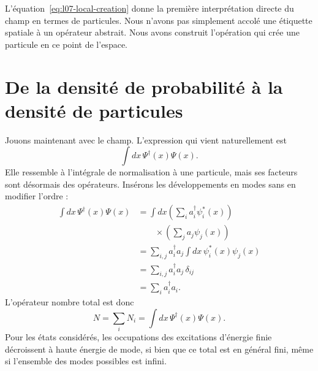 L’équation~\eqref{eq:l07-local-creation} donne la première interprétation directe du champ en termes de particules. Nous n’avons pas simplement accolé une étiquette spatiale à un opérateur abstrait. Nous avons construit l’opération qui crée une particule en ce point de l’espace.

\begin{classroomqa}
\end{classroomqa}

\begin{classroomqa}
\end{classroomqa}

\section{De la densité de probabilité à la densité de particules}

Jouons maintenant avec le champ. L’expression qui vient naturellement est
\begin{equation}
\int dx\,\Psi^\dagger(x)\Psi(x).
\end{equation}
Elle ressemble à l’intégrale de normalisation à une particule, mais ses facteurs sont désormais des opérateurs. Insérons les développements en modes sans en modifier l’ordre :
\begin{align}
\int dx\,\Psi^\dagger(x)\Psi(x)
&=\int dx
\left(\sum_i a_i^\dagger\psi_i^*(x)\right)\\
&\qquad\times\left(\sum_j a_j\psi_j(x)\right) \\
&=\sum_{i,j}a_i^\dagger a_j
\int dx\,\psi_i^*(x)\psi_j(x) \\
&=\sum_{i,j}a_i^\dagger a_j\,\delta_{ij} \\
&=\sum_i a_i^\dagger a_i.
\label{eq:l07-number-derivation}
\end{align}
L’opérateur nombre total est donc
\begin{equation}
N=\sum_i N_i
=\int dx\,\Psi^\dagger(x)\Psi(x).
\label{eq:l07-total-number}
\end{equation}
Pour les états considérés, les occupations des excitations d’énergie finie décroissent à haute énergie de mode, si bien que ce total est en général fini, même si l’ensemble des modes possibles est infini.

